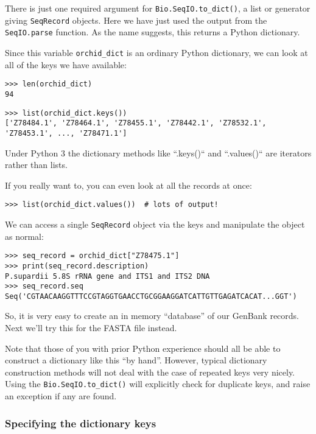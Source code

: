 There is just one required argument for \verb|Bio.SeqIO.to_dict()|, a list or
generator giving \verb|SeqRecord| objects. Here we have just used the output
from the \verb|SeqIO.parse| function. As the name suggests, this returns a
Python dictionary.

Since this variable \verb|orchid_dict| is an ordinary Python dictionary,
we can look at all of the keys we have available:

\begin{verbatim}
>>> len(orchid_dict)
94
\end{verbatim}
\begin{verbatim}
>>> list(orchid_dict.keys())
['Z78484.1', 'Z78464.1', 'Z78455.1', 'Z78442.1', 'Z78532.1', 'Z78453.1', ..., 'Z78471.1']
\end{verbatim}

Under Python 3 the dictionary methods like ``.keys()`` and ``.values()``
are iterators rather than lists.

If you really want to, you can even look at all the records at once:
\begin{verbatim}
>>> list(orchid_dict.values())  # lots of output!
\end{verbatim}

We can access a single \verb|SeqRecord| object via the keys and manipulate the object as normal:

\begin{verbatim}
>>> seq_record = orchid_dict["Z78475.1"]
>>> print(seq_record.description)
P.supardii 5.8S rRNA gene and ITS1 and ITS2 DNA
>>> seq_record.seq
Seq('CGTAACAAGGTTTCCGTAGGTGAACCTGCGGAAGGATCATTGTTGAGATCACAT...GGT')
\end{verbatim}

So, it is very easy to create an in memory ``database'' of our GenBank records.  Next we'll try this for the FASTA file instead.

Note that those of you with prior Python experience should all be able to construct a dictionary like this ``by hand''.  However, typical dictionary construction methods will not deal with the case of repeated keys very nicely.  Using the \verb|Bio.SeqIO.to_dict()| will explicitly check for duplicate keys, and raise an exception if any are found.

\subsubsection{Specifying the dictionary keys}
\label{sec:seqio-todict-functionkey}


